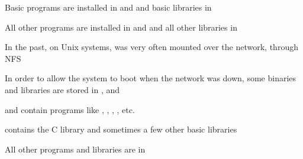   \startitemize
  \item Basic programs are installed in  and 
    and basic libraries in 
  \item All other programs are installed in  and
     and all other libraries in 
  \item In the past, on Unix systems,  was very often
    mounted over the network, through NFS
  \item In order to allow the system to boot when the network was
    down, some binaries and libraries are stored in ,
     and 
  \item {} and  contain programs like ,
    , , , etc.
  \item {} contains the C library and sometimes a few other
    basic libraries
  \item All other programs and libraries are in 
  \stopitemize
